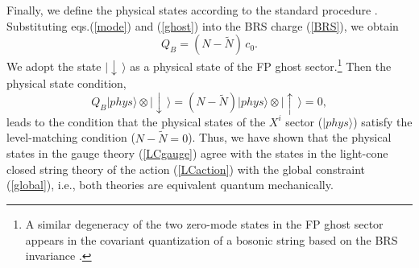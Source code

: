 \documentclass[12pt,a4paper]{article}
\newcommand{\ket}[1]{|#1\rangle}
\begin{document}
Finally, we define the physical states according to the standard
procedure \cite{KO}. Substituting eqs.(\ref{mode}) and (\ref{ghost})
into the BRS charge (\ref{BRS}), we obtain
\begin{equation}
  Q_B=(N-\tilde{N})\,c_0.
\end{equation}
We adopt the state $\ket{\!\downarrow\,}$ as a physical state of
the FP ghost sector.\footnote{A similar degeneracy of the two
zero-mode states in the FP ghost sector appears in the covariant
quantization of a bosonic string based on the BRS invariance
\cite{KO2}.} Then the physical state condition,
\begin{equation}
  Q_B \ket{phys}\otimes\ket{\!\downarrow\,}=
    (N-\tilde{N}) \ket{phys}\otimes\ket{\!\uparrow\,}=0,
\end{equation}
leads to the condition that the physical states of the $X^i$ sector
($|phys \rangle $) satisfy the level-matching condition
($N-\tilde{N} =0$).
Thus, we have shown that the physical states in the gauge theory
(\ref{LCgauge}) agree with the states in the light-cone closed
string theory of the action (\ref{LCaction}) with the global
constraint (\ref{global}), i.e., both theories are
equivalent quantum mechanically.

\end{document}
